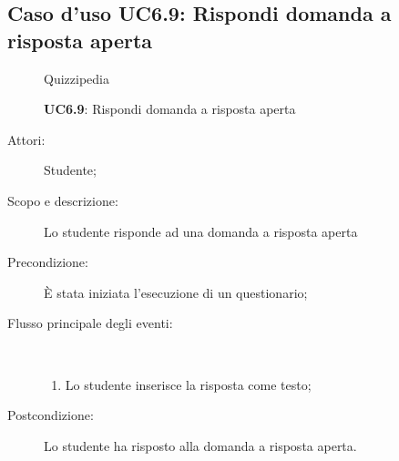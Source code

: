 \subsection{Caso d'uso UC6.9: Rispondi domanda a risposta aperta}
	\begin{figure}[H]
		\centering
		\begin{resizedtikzpicture}{\textwidth}
		\begin{umlsystem}[x=0, fill=lightgray!20]{Quizzipedia}
		\end{umlsystem}
		\end{resizedtikzpicture}
		\caption{\textbf{UC6.9}: Rispondi domanda a risposta aperta}
		\label{UC6.9}
	\end{figure}
\begin{description}
\item[Attori:] Studente;
\item[Scopo e descrizione:] Lo studente risponde ad una domanda a risposta aperta
      \item[Precondizione:] È stata iniziata l'esecuzione di un questionario;

        \item[Flusso principale degli eventi:] \ 
 \begin{enumerate}
          \item Lo studente inserisce la risposta come testo;

      \end{enumerate}
    \item[Postcondizione:] Lo studente ha risposto alla domanda a risposta aperta.
  \end{description}
\hypertarget{UC6.10}{}
